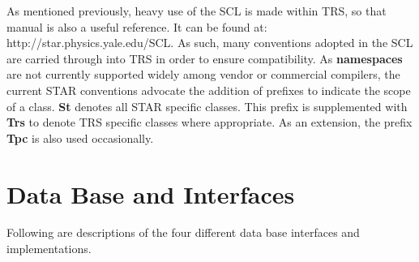 \documentclass[twoside]{article}
\newcommand{\name}[1]{\textsf{#1}}%
\begin{document}
As mentioned previously, heavy use of the SCL  is made
within \name{TRS}, so that manual is also a useful reference.  It
can be found at: http://star.physics.yale.edu/SCL.  As such, many
conventions adopted in the SCL are carried through into \name{TRS}
in order to ensure compatibility.  As {\bf namespaces} are not
currently supported
widely among vendor or commercial compilers, the current STAR
conventions advocate the addition of prefixes to indicate the
scope of a class.  {\bf St}
denotes all STAR specific classes.  This prefix is supplemented with
{\bf Trs} to denote \name{TRS} specific classes where appropriate.  As an
extension, the prefix {\bf Tpc} is also used occasionally.


\section{Data Base and Interfaces}
\label{sec:dbint}
Following are descriptions of the four different data base interfaces
and implementations.

%
%
\end{document}
